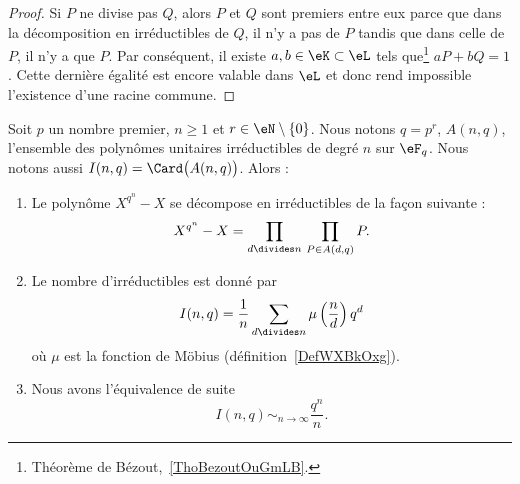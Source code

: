 \begin{proof}
	Si \( P\) ne divise pas \( Q\), alors \( P\) et \( Q\) sont premiers entre eux parce que dans la décomposition en irréductibles de \( Q\), il n'y a pas de \( P\) tandis que dans celle de \( P\), il n'y a que \( P\). Par conséquent, il existe \( a,b\in \eK\subset\eL\) tels que\footnote{Théorème de Bézout,~\ref{ThoBezoutOuGmLB}.} \( aP+bQ=1\). Cette dernière égalité est encore valable dans \( \eL\) et donc rend impossible l'existence d'une racine commune.
\end{proof}

\begin{proposition} \label{PropVFNOvzZ}
	Soit \( p\) un nombre premier, \( n\geq 1\) et \( r\in \eN\setminus\{ 0 \}\). Nous notons \( q=p^r\), \( A(n,q)\), l'ensemble des polynômes unitaires irréductibles de degré \( n\) sur \( \eF_q\). Nous notons aussi \( I(n,q)=\Card\big( A(n,q) \big)\). Alors :
	\begin{enumerate}
		\item
		      Le polynôme \( X^{q^n}-X\) se décompose en irréductibles de la façon suivante :
		      \begin{equation}
			      X^{q^n}-X=\prod_{d\divides n}\,\prod_{P\in A(d,q)}P.
		      \end{equation}
		\item
		      Le nombre d'irréductibles est donné par
		      \begin{equation}
			      I(n,q)=\frac{1}{ n }\sum_{d\divides n}\mu\left( \frac{ n }{ d } \right)q^d
		      \end{equation}
		      où \( \mu\) est la fonction de Möbius (définition~\ref{DefWXBkOxg}).
		\item
		      Nous avons l'équivalence de suite
		      \begin{equation}
			      I(n,q)\sim_{n\to\infty}\frac{ q^n }{ n }.
		      \end{equation}
	\end{enumerate}
\end{proposition}

